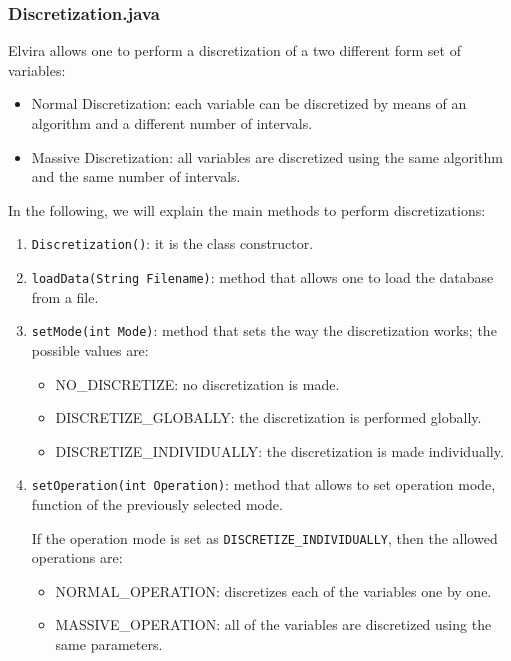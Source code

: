 \subsubsection{Discretization.java}
Elvira allows one to perform a discretization of a two different form set of variables:
\begin{itemize}
	\item	Normal Discretization: each variable can be discretized by means of an algorithm and a different
			number of intervals.
	\item	Massive Discretization: all variables are discretized using the same algorithm and the same number
			of intervals.
\end{itemize}

In the following, we will explain the main methods to perform discretizations:
\begin{enumerate}
	\item	\verb=Discretization()=: it is the class constructor.
	\item	\verb=loadData(String Filename)=: method that allows one to load the database from a file.
	\item	\verb=setMode(int Mode)=: method that sets the way the discretization works; the possible values
			are:
			\begin{itemize}
				\item	NO\_DISCRETIZE: no discretization is made.
				\item	DISCRETIZE\_GLOBALLY: the discretization is performed globally.
				\item	DISCRETIZE\_INDIVIDUALLY: the discretization is made individually.
			\end{itemize}
	\item	\verb=setOperation(int Operation)=: method that allows to set operation mode, function of the previously
			selected mode.

			If the operation mode is set as \texttt{DISCRETIZE\_INDIVIDUALLY}, then the allowed operations are:
			\begin{itemize}
				\item	NORMAL\_OPERATION: discretizes each of the variables one by one.
				\item	MASSIVE\_OPERATION: all of the variables are discretized using the same parameters.
			\end{itemize}


\end{enumerate}
